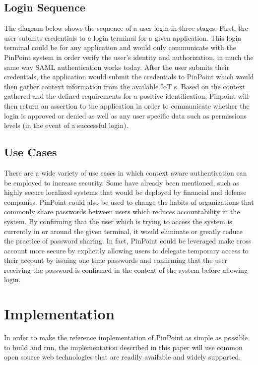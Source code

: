 \documentclass[11pt,journal]{IEEEtran}
\begin{document}
\subsection{Login Sequence}
The diagram below shows the sequence of a user login in three stages.  First, the user submits credentials to a login terminal for a given application.  This login terminal could be for any application and would only communicate with the PinPoint system in order verify the user’s identity and authorization, in much the same way SAML authentication works today.  After the user submits their credentials, the application would submit the credentials to PinPoint which would then gather context information from the available IoT s.  Based on the context gathered and the defined requirements for a positive identification, Pinpoint will then return an assertion to the application in order to communicate whether the login is approved or denied as well as any user specific data such as permissions levels (in the event of a successful login).

\subsection{Use Cases}
There are a wide variety of use cases in which context aware authentication can be employed to increase security.  Some have already been mentioned, such as highly secure localized systems that would be deployed by financial and defense companies.  PinPoint could also be used to change the habits of organizations that commonly share passwords between users which reduces accountability in the system.  By confirming that the user which is trying to access the system is currently in or around the given terminal, it would eliminate or greatly reduce the practice of password sharing.  In fact, PinPoint could be leveraged make cross account more secure by explicitly allowing users to delegate temporary access to their account by issuing one time passwords and confirming that the user receiving the password is confirmed in the context of the system before allowing login.

\section{Implementation}
In order to make the reference implementation of PinPoint as simple as possible to build and run, the implementation described in this paper will use common open source web technologies that are readily available and widely supported.
\end{document}
